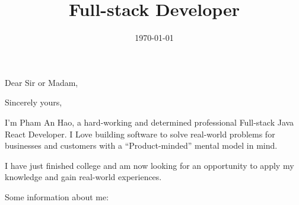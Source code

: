\documentclass[11pt,a4paper,sans]{moderncv}        %
\title{Full-stack Developer}
\begin{document}
\clearpage

\recipient{\phantom{T}}{\phantom{T}}
\date{\today}
\opening{Dear Sir or Madam,}
\closing{Sincerely yours,}
\makelettertitle

I'm Pham An Hao, a hard-working and determined professional Full-stack Java React Developer. I Love building software to solve real-world problems for businesses and customers with a ``Product-minded'' mental model in mind.



I have just finished college and am now looking for an opportunity to apply my knowledge and gain real-world experiences.

Some information about me:

\end{document}
